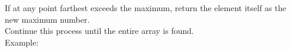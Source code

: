 \documentclass[preview]{standalone}
\begin{document}
If at any point farthest exceeds the maximum, return the element itself as the new maximum number.\\Continue this process until the entire array is found.\\Example:\\
\end{document}
